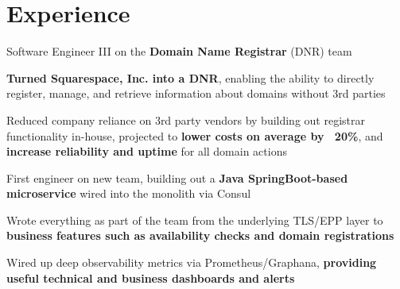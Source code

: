 \documentclass[]{two-column-resume}
\begin{document}
\hfill
\begin{minipage}[t]{0.65\textwidth} 

\section{Experience}


 \vspace{\topsep} %
 
\begin{tightemize}
\item Software Engineer III on the \textbf{Domain Name Registrar} (DNR) team
\item \textbf{Turned Squarespace, Inc. into a DNR}, enabling the ability to directly register, manage, and retrieve information about domains without 3rd parties
\item Reduced company reliance on 3rd party vendors by building out registrar functionality in-house, projected to \textbf{lower costs  on average by ~20\%}, and \textbf{increase reliability and uptime} for all domain actions
\item First engineer on new team, building out a \textbf{Java SpringBoot-based microservice} wired into the monolith via Consul
\item Wrote everything as part of the team from the underlying TLS/EPP layer to \textbf{business features such as availability checks and domain registrations}
\item Wired up deep observability metrics via Prometheus/Graphana, \textbf{providing useful technical and business dashboards and alerts}
\end{tightemize}
\sectionsep


 \vspace{\topsep} %
 

\end{minipage}
\end{document}
